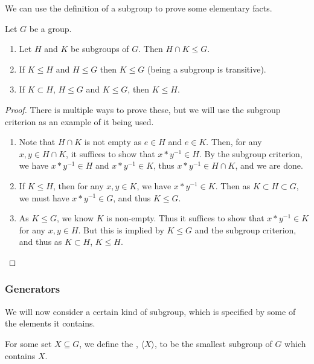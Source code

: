 \documentclass[a4paper]{scrartcl}
\begin{document}
We can use the definition of a subgroup to prove some elementary facts.
\begin{proposition}
	Let $G$ be a group.
	\begin{enumerate}[label=(\roman*)]
		\item Let $H$ and $K$ be subgroups of $G$. Then $H \cap K \leq G$.
		\item If $K \leq H$ and $H \leq G$ then $K \leq G$ (being a subgroup is transitive).
		\item If $K \subset H$, $H \leq G$ and $K \leq G$, then $K \leq H$. 
	\end{enumerate}
\end{proposition}
\begin{proof} There is multiple ways to prove these, but we will use the subgroup criterion as an example of it being used.\phantom{\qedhere}
	\begin{enumerate}[label=(\roman*)]
		\item Note that $H \cap K$ is not empty as $e \in H$ and $e \in K$. Then, for any $x, y \in H \cap K$, it suffices to show that $x * y^{-1} \in H$. By the subgroup criterion, we have $x * y^{-1} \in H$ and $x*y^{-1} \in K$, thus $x * y^{-1} \in H \cap K$, and we are done.
		\item If $K \leq H$, then for any $x, y \in K$, we have $x * y^{-1} \in K$. Then as $K \subset H \subset G$, we must have $x * y^{-1} \in G$, and thus $K \leq G$.
		\item As $K \leq G$, we know $K$ is non-empty. Thus it suffices to show that $x * y^{-1} \in K$ for any $x, y \in H$. But this is implied by $K \leq G$ and the subgroup criterion, and thus as $K \subset H$, $K \leq H$. \hfill \qedsymbol
	\end{enumerate}
\end{proof}

\subsubsection{Generators}

We will now consider a certain kind of subgroup, which is specified by some of the elements it contains.

\begin{definition}
	For some set $X \subseteq G$, we define the , $\langle X \rangle$, to be the smallest subgroup of $G$ which contains $X$.
\end{definition}
\end{document}

